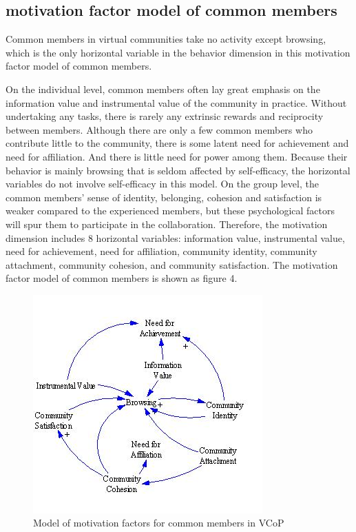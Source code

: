 \documentclass{elsarticle}
\begin{document}
\subsection{motivation factor model of common members}
\label{sec:motiv-fact-model-1}

Common members in virtual communities take no activity except browsing, which is the only horizontal variable in the behavior dimension in this motivation factor model of common members. 

On the individual level, common members often lay great emphasis on
the information value and instrumental value of the community in
practice. Without undertaking any tasks, there is rarely any extrinsic
rewards and reciprocity between members. Although there are only a few
common members who contribute little to the community, there is some
latent need for achievement and need for affiliation. And there is
little need for power among them. Because their behavior is mainly
browsing that is seldom affected by self-efficacy, the horizontal
variables do not involve self-efficacy in this model. On the group
level, the common members’ sense of identity, belonging, cohesion and
satisfaction is weaker compared to the experienced members, but these
psychological factors will spur them to participate in the
collaboration. Therefore, the motivation dimension includes 8
horizontal variables: information value, instrumental value, need for
achievement, need for affiliation, community identity, community
attachment, community cohesion, and community satisfaction. The
motivation factor model of common members is shown as figure 4.  
\begin{figure}[htpb]
  \centering
  \label{fig:common-member}
  \includegraphics{04}
  \caption{Model of motivation factors for common
    members in VCoP}
\end{figure}
\end{document}
